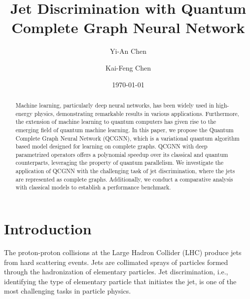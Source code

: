 \documentclass[reprint,amsmath,amssymb,prd,nofootinbib]{revtex4-2}
\begin{document}
\date{\today}

\title{Jet Discrimination with Quantum Complete Graph Neural Network}

\author{Yi-An Chen}
\author{Kai-Feng Chen}

\begin{abstract}
    Machine learning, particularly deep neural networks, has been widely used in high-energy physics, demonstrating remarkable results in various applications. Furthermore, the extension of machine learning to quantum computers has given rise to the emerging field of quantum machine learning. In this paper, we propose the Quantum Complete Graph Neural Network (QCGNN), which is a variational quantum algorithm based model designed for learning on complete graphs. QCGNN with deep parametrized operators offers a polynomial speedup over its classical and quantum counterparts, leveraging the property of quantum parallelism. We investigate the application of QCGNN with the challenging task of jet discrimination, where the jets are represented as complete graphs. Additionally, we conduct a comparative analysis with classical models to establish a performance benchmark.
\end{abstract}

\maketitle

\section{Introduction}

The proton-proton collisions at the Large Hadron Collider (LHC) produce jets from hard scattering events. Jets are collimated sprays of particles formed through the hadronization of elementary particles. Jet discrimination, i.e., identifying the type of elementary particle that initiates the jet, is one of the most challenging tasks in particle physics.
\end{document}
